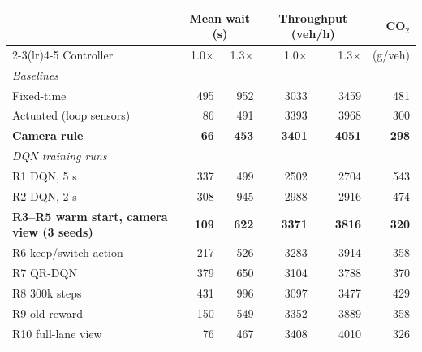 \begin{tabular}{lrrrrr}
\toprule
 & \multicolumn{2}{c}{Mean wait (s)} & \multicolumn{2}{c}{Throughput (veh/h)} & CO$_2$ \\
\cmidrule(lr){2-3}\cmidrule(lr){4-5}
Controller & 1.0$\times$ & 1.3$\times$ & 1.0$\times$ & 1.3$\times$ & (g/veh) \\
\midrule
\multicolumn{6}{l}{\textit{Baselines}} \\
Fixed-time & 495 & 952 & 3033 & 3459 & 481 \\
Actuated (loop sensors) & 86 & 491 & 3393 & 3968 & 300 \\
\rowcolor{bench}\textbf{Camera rule} & \textbf{66} & \textbf{453} & \textbf{3401} & \textbf{4051} & \textbf{298} \\
\midrule
\multicolumn{6}{l}{\textit{DQN training runs}} \\
R1 DQN, 5 s & 337 & 499 & 2502 & 2704 & 543 \\
R2 DQN, 2 s & 308 & 945 & 2988 & 2916 & 474 \\
\rowcolor{chosen}\textbf{R3--R5 warm start, camera view (3 seeds)} & \textbf{109} & \textbf{622} & \textbf{3371} & \textbf{3816} & \textbf{320} \\
R6 keep/switch action & 217 & 526 & 3283 & 3914 & 358 \\
R7 QR-DQN & 379 & 650 & 3104 & 3788 & 370 \\
R8 300k steps & 431 & 996 & 3097 & 3477 & 429 \\
R9 old reward & 150 & 549 & 3352 & 3889 & 358 \\
R10 full-lane view & 76 & 467 & 3408 & 4010 & 326 \\
\bottomrule
\end{tabular}